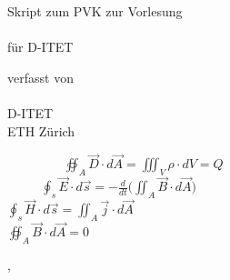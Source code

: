 

\thispagestyle{empty}  %
\large  %

\begin{center}

\vfill


Skript zum PVK zur Vorlesung\\[10mm]

{\LARGE\bfseries\mytitle} \\
\vspace{1cm}
für D-ITET
\vfill


verfasst von \\[5mm]
{\large\bfseries\myauthor}\\[5mm]
D-ITET\\
ETH Zürich \\
\vspace{4cm}
\end{center}
\begin{tcolorbox}
  \begin{center}
$ \displaystyle \ \  \ \ \  \ \  \ \ \ \ \  \ \ \ \ \  \ \ \ \oiint_A \vec{D} \cdot d \vec{A} = \iiint_V \rho \cdot dV = Q \  \ \ \ \  \ \ \ \ \ \ \ \ $ \\

$ \displaystyle  \ \ \ \  \ \ \ \   \ \ \ \ \oint_s \vec{E} \cdot d \vec{s} = - \frac{d}{dt} \bigg( \iint_A \vec{B} \cdot d \vec{A}  \bigg)$\\


$ \displaystyle \oint_s \vec{H} \cdot d \vec{s} = \iint_A \vec{j} \cdot d\vec{A}   \ \ \ \  $\\
$ \displaystyle \oiint_A \vec{B} \cdot d \vec{A} = 0 \     \   \ \ \ \  \ \ \ \   \ \ \ \  $\\
\end{center}
\end{tcolorbox}
\begin{center}
\vfill

\mysubmissiontown, \mysubmissionmonth~\mysubmissionyear

\end{center}
\normalsize %

\newpage


